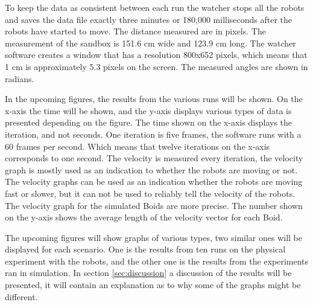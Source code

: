 To keep the data as consistent between each run the watcher stops all the robots and saves the data file exactly three minutes or 180,000 milliseconds after the robots have started to move.
The distance measured are in pixels. The measurement of the sandbox is 151.6 cm wide and 123.9 cm long. The watcher software creates a window that has a resolution 800x652 pixels, which means that 1 cm is approximately 5.3 pixels on the screen. The measured angles are shown in radians.

In the upcoming figures, the results from the various runs will be shown. On the x-axis the time will be shown, and the y-axis displays various types of data is presented depending on the figure. The time shown on the x-axis displays the iteration, and not seconds. One iteration is five frames, the software runs with a 60 frames per second. Which means that twelve iterations on the x-axis corresponds to one second. The velocity is measured every iteration, the velocity graph is mostly used as an indication to whether the robots are moving or not. The velocity graphs can be used as an indication whether the robots are moving fast or slower, but it can not be used to reliably tell the velocity of the robots. The velocity graph for the simulated Boids are more precise.
The number shown on the y-axis shows the average length of the velocity vector for each Boid.

The upcoming figures will show graphs of various types, two similar ones will be displayed for each scenario. One is the results from ten runs on the physical experiment with the robots, and the other one is the results from the experiments ran in simulation. In section \ref{sec:discussion} a discussion of the results will be presented, it will contain an explanation as to why some of the graphs might be different.

